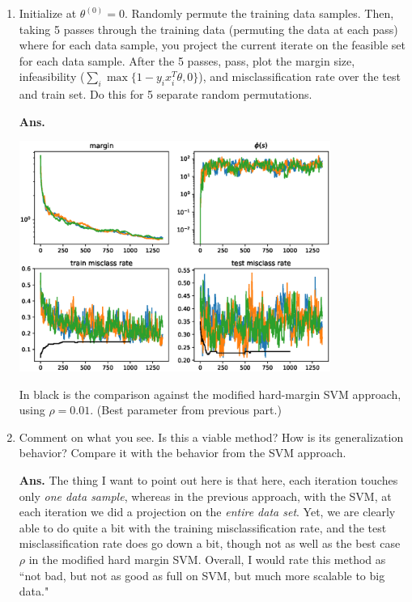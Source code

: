 \documentclass{article}
\newcommand{\showsolution}[1]{\textbf{Ans.} \;#1}
\begin{document}
\begin{enumerate}
\begin{enumerate}
\item Initialize at $\theta^{(0)} = 0$. Randomly permute the training data samples. Then, taking 5 passes through the training data (permuting the data at each pass) where for each data sample, you project the current iterate  on the feasible set for each data sample. After the 5 passes, pass, plot the margin size, infeasibility ($\sum_i \max\{1-y_ix_i^T\theta,0\}$), and misclassification rate over the test and train set. 
Do this for 5 separate random permutations.


\showsolution{

\begin{center}
\includegraphics[width=4in]{figs/hw2_kaczmarz.eps}
\end{center}

In black is the comparison against the modified hard-margin SVM approach, using $\rho = 0.01$. (Best parameter from previous part.)
}


\item Comment on what you see. Is this a viable method? How is its generalization behavior? Compare it with the behavior from the SVM approach.

\showsolution{
The thing I want to point out here is that here, each iteration touches only \emph{one data sample}, whereas in the previous approach, with the SVM, at each iteration we did a projection on the \emph{entire data set}. Yet, we are clearly able to do quite a bit with the training misclassification rate, and the test misclassification rate does go down a bit, though not as well as the best case $\rho$ in the modified hard margin SVM. Overall, I would rate this method as ``not bad, but not as good as full on SVM, but much more scalable to big data."
}

\end{enumerate}


\end{enumerate}
\end{document}
